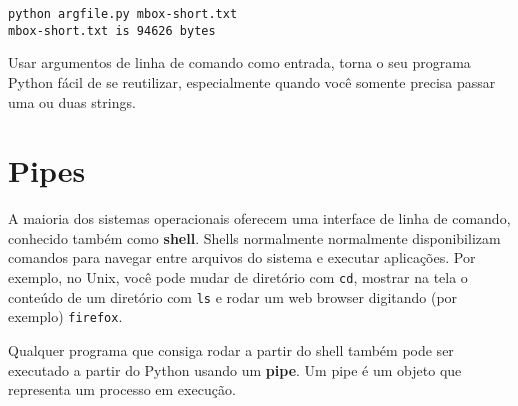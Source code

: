 \beforeverb
\begin{verbatim}
python argfile.py mbox-short.txt
mbox-short.txt is 94626 bytes
\end{verbatim}
\afterverb

Usar argumentos de linha de comando como entrada, torna o seu programa Python fácil de se reutilizar, 
especialmente quando você somente precisa passar uma ou duas strings.

\section{Pipes}


A maioria dos sistemas operacionais oferecem uma interface de linha de comando,
conhecido também como {\bf shell}. Shells normalmente normalmente disponibilizam comandos para
navegar entre arquivos do sistema e executar aplicações. Por exemplo, no Unix, você pode mudar de diretório
com {\tt cd}, mostrar na tela o conteúdo de um diretório com {\tt ls} e rodar um web browser digitando (por exemplo)
{\tt firefox}.


Qualquer programa que consiga rodar a partir do shell também pode ser
executado a partir do Python usando um {\bf pipe}. Um pipe é um objeto
que representa um processo em execução.

